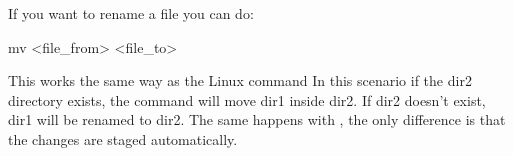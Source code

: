 \noindent If you want to rename a file you can do:
\begin{gitBashBox}
mv <file_from> <file_to>
\end{gitBashBox}

This works the same way as the Linux command   
In this scenario if the dir2 directory exists, the command will move dir1 inside dir2. If dir2 doesn’t exist, dir1 will be renamed to dir2.\newline
The same happens with , the only difference is that the changes are staged automatically.